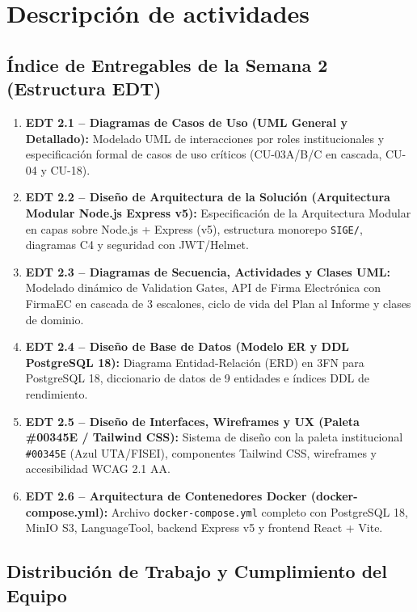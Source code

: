 \documentclass[12pt,a4paper]{article}
\begin{document}
\section{Descripción de actividades}

\subsection{Índice de Entregables de la Semana 2 (Estructura EDT)}
\begin{enumerate}[leftmargin=1.5em, itemsep=2.5pt]
    \item \textbf{EDT 2.1 -- Diagramas de Casos de Uso (UML General y Detallado):} Modelado UML de interacciones por roles institucionales y especificación formal de casos de uso críticos (CU-03A/B/C en cascada, CU-04 y CU-18).
    \item \textbf{EDT 2.2 -- Diseño de Arquitectura de la Solución (Arquitectura Modular Node.js Express v5):} Especificación de la Arquitectura Modular en capas sobre Node.js + Express (v5), estructura monorepo \texttt{SIGE/}, diagramas C4 y seguridad con JWT/Helmet.
    \item \textbf{EDT 2.3 -- Diagramas de Secuencia, Actividades y Clases UML:} Modelado dinámico de Validation Gates, API de Firma Electrónica con FirmaEC en cascada de 3 escalones, ciclo de vida del Plan al Informe y clases de dominio.
    \item \textbf{EDT 2.4 -- Diseño de Base de Datos (Modelo ER y DDL PostgreSQL 18):} Diagrama Entidad-Relación (ERD) en 3FN para PostgreSQL 18, diccionario de datos de 9 entidades e índices DDL de rendimiento.
    \item \textbf{EDT 2.5 -- Diseño de Interfaces, Wireframes y UX (Paleta \#00345E / Tailwind CSS):} Sistema de diseño con la paleta institucional \texttt{\#00345E} (Azul UTA/FISEI), componentes Tailwind CSS, wireframes y accesibilidad WCAG 2.1 AA.
    \item \textbf{EDT 2.6 -- Arquitectura de Contenedores Docker (docker-compose.yml):} Archivo \texttt{docker-compose.yml} completo con PostgreSQL 18, MinIO S3, LanguageTool, backend Express v5 y frontend React + Vite.
\end{enumerate}

\subsection{Distribución de Trabajo y Cumplimiento del Equipo}
\end{document}
